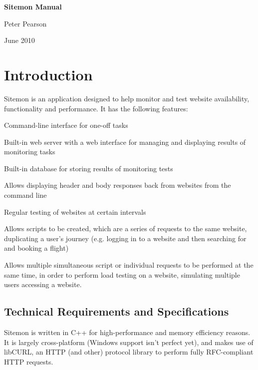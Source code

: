 \documentclass[a4paper]{article}
\newenvironment{small_list}{
\begin{itemize}
  \setlength{\itemsep}{0pt}
  \setlength{\parskip}{0pt}
  \setlength{\parsep}{0pt}
}
{\end{itemize}}
\begin{document}
\thispagestyle{empty} %
\vfill
  \begin{center}\leavevmode
    \normalfont
    {\LARGE {\bf Sitemon Manual}\par}%
    \vskip 1cm
    {\Large Peter Pearson\par}%
    \vskip 1cm
    {\Large June 2010\par}%
  \end{center}%
  \vskip 2cm

\tableofcontents

\pagebreak
	
\section{Introduction}
Sitemon is an application designed to help monitor and test website availability, functionality and performance. It has the 
following features:
\begin{small_list}
	\item Command-line interface for one-off tasks
	\item Built-in web server with a web interface for managing and displaying results of monitoring tasks
	\item Built-in database for storing results of monitoring tests
	\item Allows displaying header and body responses back from websites from the command line
	\item Regular testing of websites at certain intervals
	\item Allows scripts to be created, which are a series of requests to the same website, duplicating
	 a user's journey (e.g. logging in to a website and then searching for and booking a flight)
	\item Allows multiple simultaneous script or individual requests to be performed at the same time,
	 in order to perform load testing on a website, simulating multiple users accessing a website.
\end{small_list}

\subsection{Technical Requirements and Specifications}

Sitemon is written in C++ for high-performance and memory efficiency reasons. It is largely cross-platform (Windows
 support isn't perfect yet), and makes use of libCURL, an HTTP (and other) protocol library to perform fully
 RFC-compliant HTTP requests.\\
\end{document}
